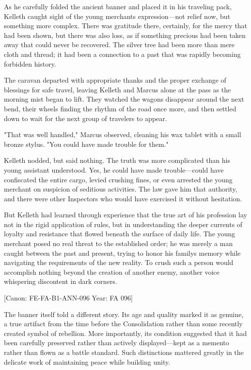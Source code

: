 As he carefully folded the ancient banner and placed it in his traveling
pack, Kelleth caught sight of the young merchant\textquotesingle s
expression---not relief now, but something more complex. There was
gratitude there, certainly, for the mercy that had been shown, but there
was also loss, as if something precious had been taken away that could
never be recovered. The silver tree had been more than mere cloth and
thread; it had been a connection to a past that was rapidly becoming
forbidden history.

The caravan departed with appropriate thanks and the proper exchange of
blessings for safe travel, leaving Kelleth and Marcus alone at the pass
as the morning mist began to lift. They watched the wagons disappear
around the next bend, their wheels finding the rhythm of the road once
more, and then settled down to wait for the next group of travelers to
appear.

"That was well handled," Marcus observed, cleaning his wax tablet with a
small bronze stylus. "You could have made trouble for them."

Kelleth nodded, but said nothing. The truth was more complicated than
his young assistant understood. Yes, he could have made trouble---could
have confiscated the entire cargo, levied crushing fines, or even
arrested the young merchant on suspicion of seditious activities. The
law gave him that authority, and there were other Inspectors who would
have exercised it without hesitation.

But Kelleth had learned through experience that the true art of his
profession lay not in the rigid application of rules, but in
understanding the deeper currents of loyalty and resistance that flowed
beneath the surface of daily life. The young merchant posed no real
threat to the established order; he was merely a man caught between the
past and present, trying to honor his family\textquotesingle s memory
while navigating the requirements of the new reality. To crush such a
person would accomplish nothing beyond the creation of another enemy,
another voice whispering discontent in dark corners.

{[}Canon: FE-FA-B1-ANN-096 \textbar{} Year: FA 096{]}

The banner itself told a different story. Its age and quality marked it
as genuine, a true artifact from the time before the Consolidation
rather than some recently created symbol of rebellion. More importantly,
its condition suggested that it had been carefully preserved rather than
actively displayed---kept as a memento rather than flown as a battle
standard. Such distinctions mattered greatly in the delicate work of
maintaining peace while building unity.

